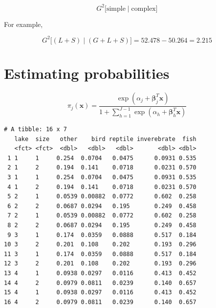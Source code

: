 \documentclass[]{book}
\newenvironment{Shaded}{\begin{snugshade}}{\end{snugshade}}
\newcommand{\DataTypeTok}[1]{\textcolor[rgb]{0.13,0.29,0.53}{#1}}
\newcommand{\KeywordTok}[1]{\textcolor[rgb]{0.13,0.29,0.53}{\textbf{#1}}}
\newcommand{\NormalTok}[1]{#1}
\newcommand{\OperatorTok}[1]{\textcolor[rgb]{0.81,0.36,0.00}{\textbf{#1}}}
\newcommand{\StringTok}[1]{\textcolor[rgb]{0.31,0.60,0.02}{#1}}
\begin{document}
\[G^2\Big[\text{simple} \mid \text{complex} \Big]\]

For example,

\[G^2\Big[(L + S) \mid (G + L + S) \Big] = 52.478 - 50.264 =  2.215\]

\hypertarget{estimating-probabilities}{%
\section{Estimating probabilities}\label{estimating-probabilities}}

\[\pi_j(\mathbf{x}) = \frac{\exp(\alpha_j + \boldsymbol\beta_j^T \mathbf{x})}{1 + \sum\limits_{h = 1}^{J - 1}\exp(\alpha_h + \boldsymbol\beta_h^T\mathbf{x})}\]

\begin{Shaded}
\end{Shaded}

\begin{verbatim}
# A tibble: 16 x 7
   lake  size   other    bird reptile inverebrate  fish
   <fct> <fct>  <dbl>   <dbl>   <dbl>       <dbl> <dbl>
 1 1     1     0.254  0.0704   0.0475      0.0931 0.535
 2 1     2     0.194  0.141    0.0718      0.0231 0.570
 3 1     1     0.254  0.0704   0.0475      0.0931 0.535
 4 1     2     0.194  0.141    0.0718      0.0231 0.570
 5 2     1     0.0539 0.00882  0.0772      0.602  0.258
 6 2     2     0.0687 0.0294   0.195       0.249  0.458
 7 2     1     0.0539 0.00882  0.0772      0.602  0.258
 8 2     2     0.0687 0.0294   0.195       0.249  0.458
 9 3     1     0.174  0.0359   0.0888      0.517  0.184
10 3     2     0.201  0.108    0.202       0.193  0.296
11 3     1     0.174  0.0359   0.0888      0.517  0.184
12 3     2     0.201  0.108    0.202       0.193  0.296
13 4     1     0.0938 0.0297   0.0116      0.413  0.452
14 4     2     0.0979 0.0811   0.0239      0.140  0.657
15 4     1     0.0938 0.0297   0.0116      0.413  0.452
16 4     2     0.0979 0.0811   0.0239      0.140  0.657
\end{verbatim}
\end{document}
